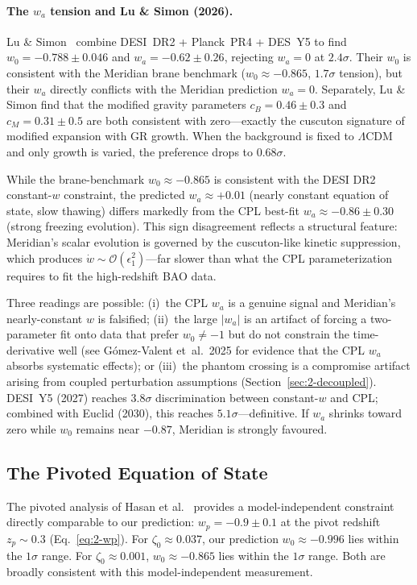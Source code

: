 \paragraph{The $w_a$ tension and Lu \& Simon (2026).}
Lu \& Simon~\cite{ch2:LuSimon2026} combine DESI~DR2 + Planck~PR4 + DES~Y5 to find $w_0 = -0.788 \pm 0.046$ and $w_a = -0.62 \pm 0.26$, rejecting $w_a = 0$ at $2.4\sigma$. Their $w_0$ is consistent with the Meridian brane benchmark ($w_0 \approx -0.865$, $1.7\sigma$ tension), but their $w_a$ directly conflicts with the Meridian prediction $w_a = 0$. Separately, Lu \& Simon find that the modified gravity parameters $c_B = 0.46 \pm 0.3$ and $c_M = 0.31 \pm 0.5$ are both consistent with zero---exactly the cuscuton signature of modified expansion with GR growth. When the background is fixed to $\Lambda$CDM and only growth is varied, the preference drops to $0.68\sigma$.

While the brane-benchmark $w_0 \approx -0.865$ is consistent with the DESI DR2 constant-$w$ constraint, the predicted $w_a \approx +0.01$ (nearly constant equation of state, slow thawing) differs markedly from the CPL best-fit $w_a \approx -0.86 \pm 0.30$ (strong freezing evolution). This sign disagreement reflects a structural feature: Meridian's scalar evolution is governed by the cuscuton-like kinetic suppression, which produces $\dot{w} \sim \mathcal{O}(\epsilon_1^2)$---far slower than what the CPL parameterization requires to fit the high-redshift BAO data.

Three readings are possible: (i)~the CPL $w_a$ is a genuine signal and Meridian's nearly-constant $w$ is falsified; (ii)~the large $|w_a|$ is an artifact of forcing a two-parameter fit onto data that prefer $w_0 \neq -1$ but do not constrain the time-derivative well (see G\'omez-Valent et~al.\ 2025 for evidence that the CPL $w_a$ absorbs systematic effects); or (iii)~the phantom crossing is a compromise artifact arising from coupled perturbation assumptions (Section~\ref{sec:2-decoupled}). DESI~Y5 (2027) reaches $3.8\sigma$ discrimination between constant-$w$ and CPL; combined with Euclid (2030), this reaches $5.1\sigma$---definitive. If $w_a$ shrinks toward zero while $w_0$ remains near $-0.87$, Meridian is strongly favoured.

\subsection{The Pivoted Equation of State}
\label{sec:2-CPL-pivot}

The pivoted analysis of Hasan et al.~\cite{ch2:Hasan2025} provides a model-independent constraint directly comparable to our prediction: $w_p = -0.9 \pm 0.1$ at the pivot redshift $z_p \sim 0.3$ (Eq.~\ref{eq:2-wp}). For $\zeta_0 \approx 0.037$, our prediction $w_0 \approx -0.996$ lies within the $1\sigma$ range. For $\zeta_0 \approx 0.001$, $w_0 \approx -0.865$ lies within the $1\sigma$ range. Both are broadly consistent with this model-independent measurement.

